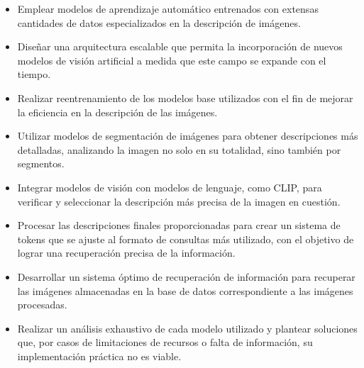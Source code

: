 \begin{itemize}
\item Emplear modelos de aprendizaje autom\'atico entrenados con extensas cantidades de datos especializados en la descripci\'on de im\'agenes.
\item Diseñar una arquitectura escalable que permita la incorporaci\'on de nuevos modelos de visi\'on artificial a medida que este campo se expande con el tiempo.
\item Realizar reentrenamiento de los modelos base utilizados con el fin de mejorar la eficiencia en la descripci\'on de las im\'agenes.
\item Utilizar modelos de segmentaci\'on de im\'agenes para obtener descripciones m\'as detalladas, analizando la imagen no solo en su totalidad, sino tambi\'en por segmentos.
\item Integrar modelos de visi\'on con modelos de lenguaje, como CLIP, para verificar y seleccionar la descripci\'on m\'as precisa de la imagen en cuesti\'on.
\item Procesar las descripciones finales proporcionadas para crear un sistema de tokens que se ajuste al formato de consultas m\'as utilizado, con el objetivo de lograr una recuperaci\'on precisa de la informaci\'on.
\item Desarrollar un sistema \'optimo de recuperaci\'on de informaci\'on para recuperar las im\'agenes almacenadas en la base de datos correspondiente a las im\'agenes procesadas.
\item Realizar un an\'alisis exhaustivo de cada modelo utilizado y plantear soluciones que, por casos de limitaciones de recursos o falta de informaci\'on, su implementaci\'on pr\'actica no es viable.
\end{itemize}
